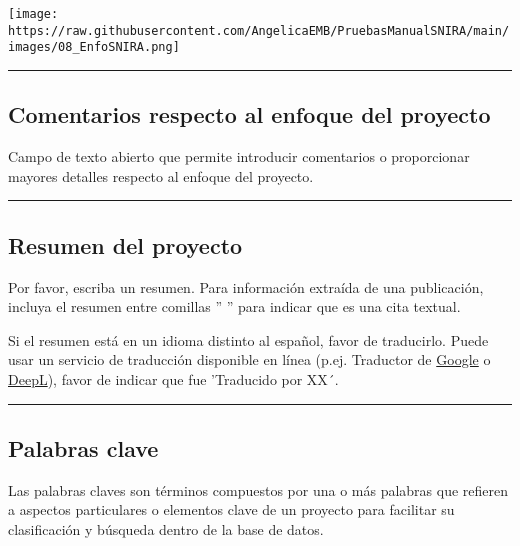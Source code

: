 \documentclass[
]{book}
\begin{document}
\texttt{[image: https://raw.githubusercontent.com/AngelicaEMB/PruebasManualSNIRA/main/images/08\_EnfoSNIRA.png]}

\begin{center}\rule{0.5\linewidth}{0.5pt}\end{center}

\hypertarget{comentarios-respecto-al-enfoque-del-proyecto}{%
\subsection*{Comentarios respecto al enfoque del proyecto}\label{comentarios-respecto-al-enfoque-del-proyecto}}

Campo de texto abierto que permite introducir comentarios o proporcionar mayores detalles respecto al enfoque del proyecto.

\begin{center}\rule{0.5\linewidth}{0.5pt}\end{center}

\hypertarget{resumen-del-proyecto}{%
\subsection*{Resumen del proyecto}\label{resumen-del-proyecto}}

Por favor, escriba un resumen.
Para información extraída de una publicación, incluya el resumen entre comillas '' '' para indicar que es una cita textual.

Si el resumen está en un idioma distinto al español, favor de traducirlo. Puede usar un servicio de traducción disponible en línea (p.ej. Traductor de \href{https://translate.google.com.mx/?hl=es}{Google} o \href{https://www.deepl.com/es/translator}{DeepL}), favor de indicar que fue 'Traducido por XX´.

\begin{center}\rule{0.5\linewidth}{0.5pt}\end{center}

\hypertarget{palabras-clave}{%
\subsection*{Palabras clave}\label{palabras-clave}}

Las palabras claves son términos compuestos por una o más palabras que refieren a aspectos particulares o elementos clave de un proyecto para facilitar su clasificación y búsqueda dentro de la base de datos.
\end{document}
